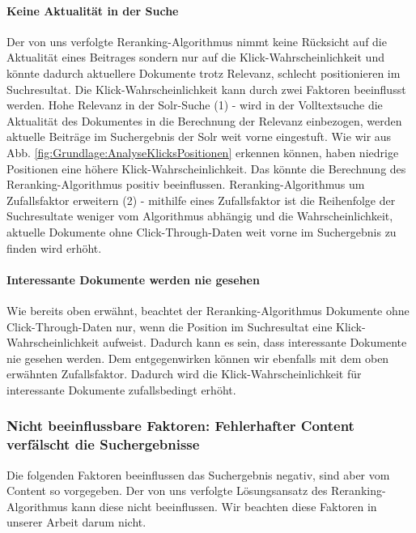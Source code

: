 \paragraph{Keine Aktualität in der Suche}
Der von uns verfolgte Reranking-Algorithmus nimmt keine Rücksicht auf die \glqq Aktualität\grqq{} eines Beitrages sondern nur auf die Klick-Wahrscheinlichkeit und könnte dadurch aktuellere Dokumente trotz Relevanz, schlecht positionieren im Suchresultat.  Die Klick-Wahrscheinlichkeit kann durch zwei Faktoren beeinflusst werden. Hohe Relevanz in der Solr-Suche (1) - wird in der Volltextsuche die Aktualität des Dokumentes in die Berechnung der Relevanz einbezogen, werden aktuelle Beiträge im Suchergebnis der Solr weit vorne eingestuft. Wie wir aus Abb. \ref{fig:Grundlage:AnalyseKlicksPositionen} erkennen können, haben niedrige Positionen eine höhere Klick-Wahrscheinlichkeit. Das könnte die Berechnung des Reranking-Algorithmus positiv beeinflussen. Reranking-Algorithmus um Zufallsfaktor erweitern (2) - mithilfe eines Zufallsfaktor ist die Reihenfolge der Suchresultate weniger vom Algorithmus abhängig und die Wahrscheinlichkeit, aktuelle Dokumente ohne Click-Through-Daten weit vorne im Suchergebnis zu finden wird erhöht.

\paragraph{Interessante Dokumente werden nie gesehen}
Wie bereits oben erwähnt, beachtet der Reranking-Algorithmus Dokumente ohne Click-Through-Daten nur, wenn die Position im Suchresultat eine Klick-Wahrscheinlichkeit aufweist. Dadurch kann es sein, dass interessante Dokumente nie gesehen werden. Dem entgegenwirken können wir ebenfalls mit dem oben erwähnten Zufallsfaktor. Dadurch wird die Klick-Wahrscheinlichkeit für interessante Dokumente zufallsbedingt erhöht.

\subsubsection{Nicht beeinflussbare Faktoren: Fehlerhafter Content verfälscht die Suchergebnisse}
\label{sec:Grundlagen:Grundbegriffe:SemantikUserInteraktionen:FehlerhafterContent}

Die folgenden Faktoren beeinflussen das Suchergebnis negativ, sind aber vom Content so vorgegeben. Der von uns verfolgte Lösungsansatz des Reranking-Algorithmus kann diese nicht beeinflussen. Wir beachten diese Faktoren in unserer Arbeit darum nicht.

